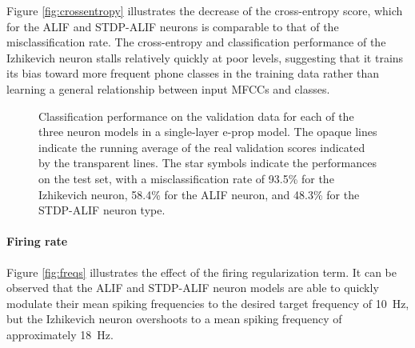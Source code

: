 		Figure \ref{fig:crossentropy} illustrates the decrease of the cross-entropy score, which for the ALIF and STDP-ALIF neurons is comparable to that of the misclassification rate.
		The cross-entropy and classification performance of the Izhikevich neuron stalls relatively quickly at poor levels, suggesting that it trains its bias toward more frequent phone classes in the training data rather than learning a general relationship between input MFCCs and classes.

		\begin{figure}[bth]
		    \myfloatalign
		     \quad
		    \caption[Single-layer classification performance per neuron model]{Classification performance on the validation data for each of the three neuron models in a single-layer e-prop model. The opaque lines indicate the running average of the real validation scores indicated by the transparent lines. The star symbols indicate the performances on the test set, with a misclassification rate of 93.5\% for the Izhikevich neuron, 58.4\% for the ALIF neuron, and 48.3\% for the STDP-ALIF neuron type.}\label{fig:sl-acc}
		\end{figure}

	\paragraph{Firing rate}
		Figure \ref{fig:freqs} illustrates the effect of the firing regularization term.
		It can be observed that the ALIF and STDP-ALIF neuron models are able to quickly modulate their mean spiking frequencies to the desired target frequency of \SI{10}{\Hz}, but the Izhikevich neuron overshoots to a mean spiking frequency of approximately \SI{18}{\Hz}.

